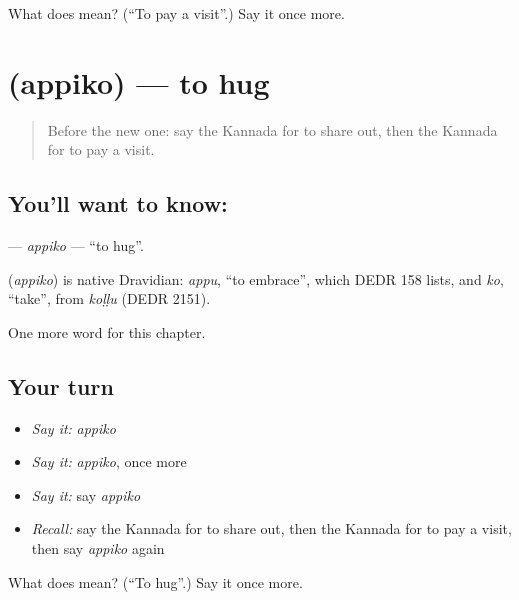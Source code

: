 \begin{tcolorbox}[breakable,colback=teal!4,colframe=teal!35!black,title={Before you move on}]
What does   mean? (\textquotedblleft{}To pay a visit\textquotedblright{}.) Say it once more.
\end{tcolorbox}
\section[\texorpdfstring{\kn{ಅಪ್ಪಿಕೊ} (appiko)}{ಅಪ್ಪಿಕೊ (appiko)}]{ (appiko) — to hug}

\label{lesson:KA-C239-appiko}



\begin{quote}
Before the new one: say the Kannada for to share out, then the Kannada for to pay a visit.
\end{quote}

\subsection*{You'll want to know: }
\textbf{} — \emph{appiko} — \textquotedblleft{}to hug\textquotedblright{}.

\begin{cousinweb}
\textbf{} (\emph{appiko}) is native Dravidian: \emph{appu}, \textquotedblleft{}to embrace\textquotedblright{}, which DEDR 158 lists, and \emph{ko}, \textquotedblleft{}take\textquotedblright{}, from \emph{koḷḷu} (DEDR 2151).
\end{cousinweb}

\begin{grammarlens}[title={What you've built}]
One more word for this chapter.
\end{grammarlens}

\subsection*{Your turn}
\begin{itemize}
\raggedright
  \item \emph{Say it:} \emph{appiko}
  \item \emph{Say it:} \emph{appiko}, once more
  \item \emph{Say it:} say \emph{appiko}
  \item \emph{Recall:} say the Kannada for to share out, then the Kannada for to pay a visit, then say \emph{appiko} again
\end{itemize}

\begin{tcolorbox}[breakable,colback=teal!4,colframe=teal!35!black,title={Before you move on}]
What does  mean? (\textquotedblleft{}To hug\textquotedblright{}.) Say it once more.
\end{tcolorbox}
